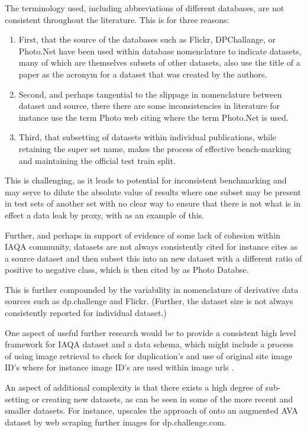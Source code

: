 The terminology used, including abbreviations of different databases, are not consistent throughout the literature. This is for three reasons:

\begin{enumerate} 

\item First, that the source of the databases such as Flickr, DPChallange, or Photo.Net have been used within database nomenclature to indicate datasets, many of which are themselves subsets of other datasets, \cite{Spathis2016} also use the title of a paper as the acronym for a dataset that was created by the authors. 

\item Second, and perhaps tangential to the slippage in nomenclature between dataset and source, there there are some inconsistencies in literature for instance \cite{Kanwal2021} use the term Photo web citing \cite{Datta2006} where the term Photo.Net is used.

\item Third, that subsetting of datasets within individual publications, while retaining the super set name, makes the process of effective bench-marking and maintaining the official test train split. 
\end{enumerate} 

This is challenging, as it leads to potential for inconsistent benchmarking and may serve to dilute the absolute value of results where one subset may be present in test sets of another set with no clear way to ensure that there is not what is in effect a data leak by proxy, with \cite{Lu2015a} as an example of this.  

Further, and perhaps in support of evidence of some lack of cohesion within IAQA community, datasets are not always consistently cited for instance \cite[539]{Lo2013} cites \cite{Tang2013a} as a source dataset and then subset this into an new dataset with a different ratio of positive to negative class, which is then cited by \cite[4]{Kanwal2021} as Photo Databse. 

This is further compounded by the variability in nomenclature of derivative data sources such as dp.challenge and Flickr. (Further, the dataset size is not always consistently reported for individual dataset.) 

One aspect of useful further research would be to provide a consistent high level framework for IAQA dataset and a data schema, which might include a process of using image retrieval to check for duplication's and use of original site image ID's where for instance image ID's are used within image urls . 

An aspect of additional complexity is that there exists a high degree of sub-setting or creating new datasets, as can be seen in some of the more recent and smaller datasets. For instance, \cite{Jin2019} upscales the approach of \cite{Chang2017} onto an augmented AVA dataset by web scraping further images for dp.challenge.com. 


